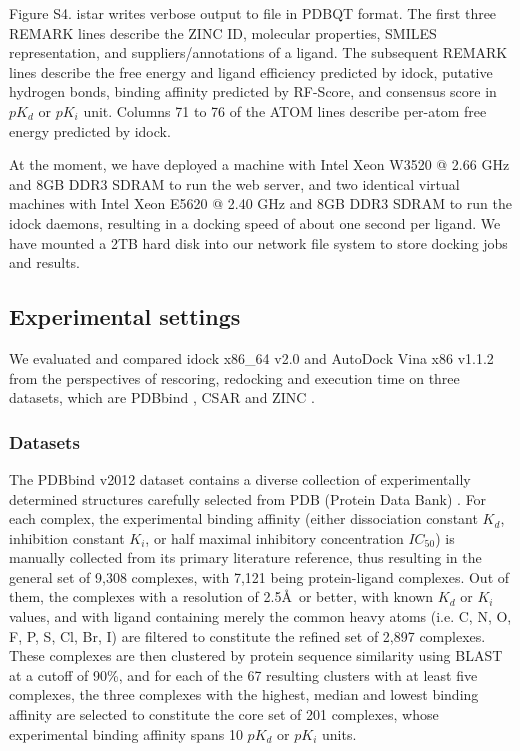 Figure S4. istar writes verbose output to file in PDBQT format. The first three REMARK lines describe the ZINC ID, molecular properties, SMILES representation, and suppliers/annotations of a ligand. The subsequent REMARK lines describe the free energy and ligand efficiency predicted by idock, putative hydrogen bonds, binding affinity predicted by RF-Score, and consensus score in $pK_d$ or $pK_i$ unit. Columns 71 to 76 of the ATOM lines describe per-atom free energy predicted by idock.

At the moment, we have deployed a machine with Intel Xeon W3520 @ 2.66 GHz and 8GB DDR3 SDRAM to run the web server, and two identical virtual machines with Intel Xeon E5620 @ 2.40 GHz and 8GB DDR3 SDRAM to run the idock daemons, resulting in a docking speed of about one second per ligand. We have mounted a 2TB hard disk into our network file system to store docking jobs and results.

\subsection{Experimental settings}

We evaluated and compared idock x86\_64 v2.0 and AutoDock Vina x86 v1.1.2 from the perspectives of rescoring, redocking and execution time on three datasets, which are PDBbind \citep{529,530}, CSAR \citep{857,960} and ZINC \citep{532,1178}.

\subsubsection{Datasets}

The PDBbind v2012 dataset contains a diverse collection of experimentally determined structures carefully selected from PDB (Protein Data Bank) \citep{540,537}. For each complex, the experimental binding affinity (either dissociation constant $K_d$, inhibition constant $K_i$, or half maximal inhibitory concentration $IC_{50}$) is manually collected from its primary literature reference, thus resulting in the general set of 9,308 complexes, with 7,121 being protein-ligand complexes. Out of them, the complexes with a resolution of 2.5\AA\ or better, with known $K_d$ or $K_i$ values, and with ligand containing merely the common heavy atoms (i.e. C, N, O, F, P, S, Cl, Br, I) are filtered to constitute the refined set of 2,897 complexes. These complexes are then clustered by protein sequence similarity using BLAST at a cutoff of 90\%, and for each of the 67 resulting clusters with at least five complexes, the three complexes with the highest, median and lowest binding affinity are selected to constitute the core set of 201 complexes, whose experimental binding affinity spans 10 $pK_d$ or $pK_i$ units.

